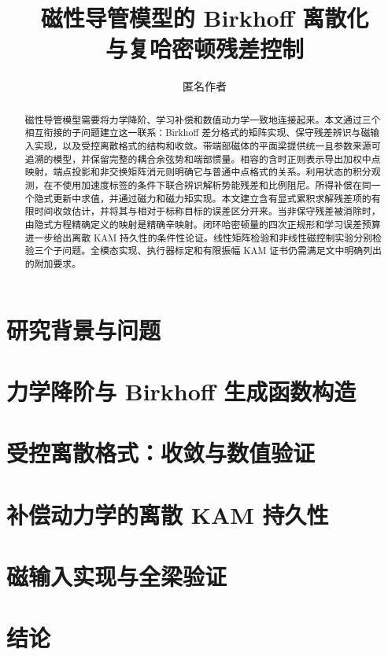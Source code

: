 \documentclass[doublespace,Afour,sageh]{sagej}
\begin{document}
\title{磁性导管模型的 Birkhoff 离散化\\与复哈密顿残差控制}
\author{匿名作者}
\begin{abstract}
磁性导管模型需要将力学降阶、学习补偿和数值动力学一致地连接起来。本文通过三个相互衔接的子问题建立这一联系：Birkhoff 差分格式的矩阵实现、保守残差辨识与磁输入实现，以及受控离散格式的结构和收敛。带端部磁体的平面梁提供统一且参数来源可追溯的模型，并保留完整的耦合余弦势和端部惯量。相容的含时正则表示导出加权中点映射，端点投影和非交换矩阵消元则明确它与普通中点格式的关系。利用状态的积分观测，在不使用加速度标签的条件下联合辨识解析势能残差和比例阻尼。所得补偿在同一个隐式更新中求值，并通过磁力和磁力矩实现。本文建立含有显式累积求解残差项的有限时间收敛估计，并将其与相对于标称目标的误差区分开来。当非保守残差被消除时，由隐式方程精确定义的映射是精确辛映射。闭环哈密顿量的四次正规形和学习误差预算进一步给出离散 KAM 持久性的条件性论证。线性矩阵检验和非线性磁控制实验分别检验三个子问题。全模态实现、执行器标定和有限振幅 KAM 证书仍需满足文中明确列出的附加要求。
\end{abstract}
\maketitle
\raggedbottom
\section{研究背景与问题}\label{sec:background}

\section{力学降阶与 Birkhoff 生成函数构造}\label{sec:derivation}


\section{受控离散格式：收敛与数值验证}\label{sec:analysis}


\section{补偿动力学的离散 KAM 持久性}\label{sec:kam}

\section{磁输入实现与全梁验证}\label{sec:application}

\section{结论}\label{sec:conclusion}



\end{document}
